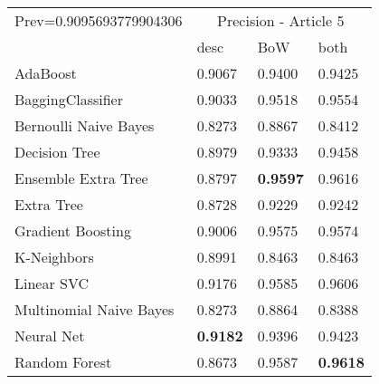 \begin{tabular}{|l|l|l|l| }
\hline
Prev=0.9095693779904306 &  \multicolumn{3}{c|}{Precision - Article 5} \\
\cline{2-4} & desc & BoW & both \\ \hline
AdaBoost                & 0.9067 & 0.9400 & 0.9425\\
BaggingClassifier       & 0.9033 & 0.9518 & 0.9554\\
Bernoulli Naive Bayes   & 0.8273 & 0.8867 & 0.8412\\
Decision Tree           & 0.8979 & 0.9333 & 0.9458\\
Ensemble Extra Tree     & 0.8797 & {\bf 0.9597} & 0.9616\\
Extra Tree              & 0.8728 & 0.9229 & 0.9242\\
Gradient Boosting       & 0.9006 & 0.9575 & 0.9574\\
K-Neighbors             & 0.8991 & 0.8463 & 0.8463\\
Linear SVC              & 0.9176 & 0.9585 & 0.9606\\
Multinomial Naive Bayes & 0.8273 & 0.8864 & 0.8388\\
Neural Net              & {\bf 0.9182} & 0.9396 & 0.9423\\
Random Forest           & 0.8673 & 0.9587 & {\bf 0.9618}\\
\hline
\end{tabular}